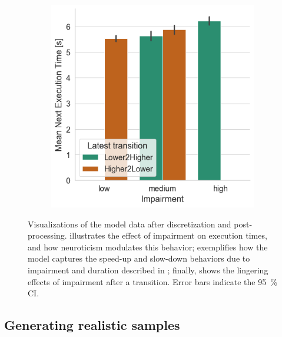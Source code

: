 \begin{figure}
\begin{subfigure}[t]{.28\textwidth}
        \caption{}\label{fig:timing:durvsetime}
    \end{subfigure}%
    \hspace{\fill}%
    \begin{subfigure}[t]{.28\textwidth}
        \centering
        \includegraphics[width=\textwidth]{./model_data/impairment_transition_vs_exectime.png}
        \caption{}\label{fig:timing:imptransvsetime}
    \end{subfigure}%
    \caption{%
        Visualizations of the model data after discretization and post-processing.
         illustrates the effect of impairment on execution times, and how neuroticism modulates this behavior;
         exemplifies how the model captures the speed-up and slow-down behaviors due to impairment and duration described in \textcite{olguinmunoz:impact2021};
        finally,  shows the lingering effects of impairment after a transition.
        Error bars indicate the \SI{95}{\percent} \ac{CI}.
    }\label{fig:timing}
\end{figure}

\subsection{Generating realistic samples}\label{ssec:model:frames}

